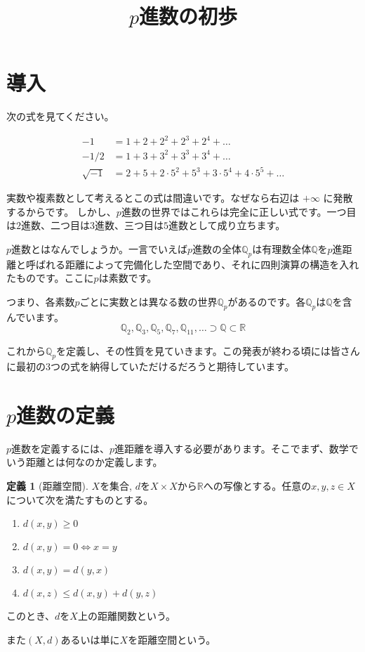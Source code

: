 \documentclass[uplatex]{jsarticle}
\newcommand{\Q}{\mathbb{Q}}
\newcommand{\R}{\mathbb{R}}
\theoremstyle{definition} %
\newtheorem{defi}[thm]{定義}
\begin{document}
\title{$p$進数の初歩}
\maketitle

\section{導入}

次の式を見てください。

\begin{align*}
-1 &= 1 + 2 + 2^2 + 2^3 + 2^4 + \dots \\
-1/2 &= 1 + 3 + 3^2 + 3^3 + 3^4 + \dots \\
\sqrt{-1} &= 2 + 5 + 2 \cdot 5^2 + 5^3 + 3 \cdot 5^4 + 4 \cdot 5^5 + \dots
\end{align*}

実数や複素数として考えるとこの式は間違いです。なぜなら右辺は $+\infty$ に発散するからです。
しかし、$p$進数の世界ではこれらは完全に正しい式です。一つ目は$2$進数、二つ目は$3$進数、三つ目は$5$進数として成り立ちます。

$p$進数とはなんでしょうか。一言でいえば$p$進数の全体$\Q_p$は有理数全体$\Q$を$p$進距離と呼ばれる距離によって完備化した空間であり、それに四則演算の構造を入れたものです。ここに$p$は素数です。

つまり、各素数$p$ごとに実数とは異なる数の世界$\Q_p$があるのです。各$\Q_p$は$\Q$を含んでいます。
\[
\Q_2, \Q_3, \Q_5, \Q_7, \Q_{11}, \dots \supset \Q \subset \mathbb{R}
\]

これから$\Q_p$を定義し、その性質を見ていきます。この発表が終わる頃には皆さんに最初の3つの式を納得していただけるだろうと期待しています。

\section{$p$進数の定義}

$p$進数を定義するには、$p$進距離を導入する必要があります。そこでまず、数学でいう距離とは何なのか定義します。

\begin{oframed}\begin{defi}[距離空間]
$X$を集合, $d$を$X \times X$から$\R$への写像とする。任意の$x, y, z \in X$について次を満たすものとする。
\begin{enumerate}
	\item $d(x, y) \geq 0$
	\item $d(x, y) = 0 \iff x = y$
	\item $d(x, y) = d(y, x)$
	\item $d(x, z) \leq d(x, y) + d(y, z)$
\end{enumerate}
このとき、$d$を$X$上の距離関数という。

また$(X, d)$あるいは単に$X$を距離空間という。
\end{defi}\end{oframed}
\end{document}
